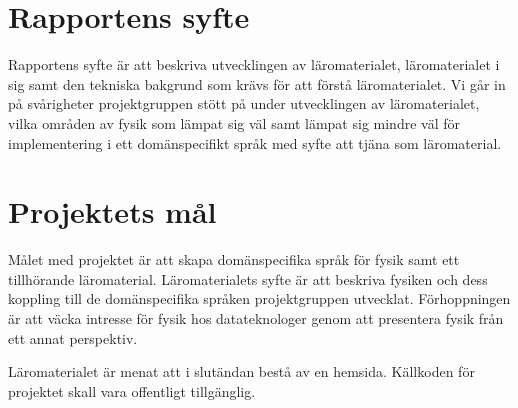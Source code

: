 \section{Rapportens syfte}

\begin{draft}
Rapportens syfte är att beskriva utvecklingen av läromaterialet, läromaterialet
i sig samt den tekniska bakgrund som krävs för att förstå läromaterialet. Vi går in på
svårigheter projektgruppen stött på under utvecklingen av läromaterialet, vilka områden
av fysik som lämpat sig väl samt lämpat sig mindre väl för implementering i ett 
domänspecifikt språk med syfte att tjäna som läromaterial.

\end{draft}


\section{Projektets mål}

\begin{draft}

\iffalse
Projekets mål är att skapa ett roligt läromaterial som kombinerar fysik med
tillhörande domänspecika språk. Läromaterialets syfte är att väcka intresse hos läsaren
för fysikaliska samband samt inspirera till vidare studier. DSL:erna är menade att modellera specifikt utvalda
områden inom fysik. Den tillhörande brödtexten är menad att beskriva både DSL:erna, fysiken i sig,    %
samt kopplingen mellan dem.
\fi
Målet med projektet är att skapa domänspecifika språk för fysik samt ett   %
tillhörande läromaterial. Läromaterialets syfte är att beskriva fysiken och  %
dess koppling till de domänspecifika språken projektgruppen utvecklat. Förhoppningen är att väcka intresse
för fysik hos datateknologer genom att presentera fysik från ett annat
perspektiv.

Läromaterialet är menat att i slutändan bestå av en hemsida. Källkoden för projektet
skall vara offentligt tillgänglig.

\end{draft}

